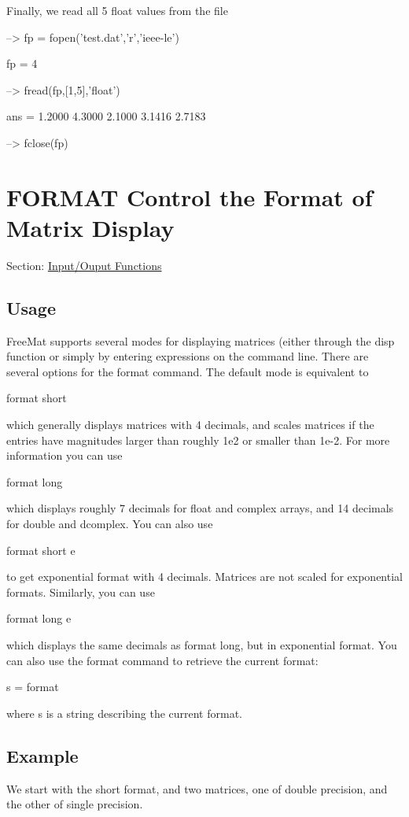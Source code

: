 Finally, we read all 5 {\ttfamily float} values from the file


\begin{DoxyVerbInclude}
--> fp = fopen('test.dat','r','ieee-le')

fp = 
 4 

--> fread(fp,[1,5],'float')

ans = 
    1.2000    4.3000    2.1000    3.1416    2.7183 

--> fclose(fp)
\end{DoxyVerbInclude}
 \hypertarget{io_format}{}\section{F\-O\-R\-M\-A\-T Control the Format of Matrix Display}\label{io_format}
Section\-: \hyperlink{sec_io}{Input/\-Ouput Functions} \hypertarget{vtkwidgets_vtkxyplotwidget_Usage}{}\subsection{Usage}\label{vtkwidgets_vtkxyplotwidget_Usage}
Free\-Mat supports several modes for displaying matrices (either through the {\ttfamily disp} function or simply by entering expressions on the command line. There are several options for the format command. The default mode is equivalent to \begin{DoxyVerb}   format short
\end{DoxyVerb}
 which generally displays matrices with 4 decimals, and scales matrices if the entries have magnitudes larger than roughly {\ttfamily 1e2} or smaller than {\ttfamily 1e-\/2}. For more information you can use \begin{DoxyVerb}   format long
\end{DoxyVerb}
 which displays roughly 7 decimals for {\ttfamily float} and {\ttfamily complex} arrays, and 14 decimals for {\ttfamily double} and {\ttfamily dcomplex}. You can also use \begin{DoxyVerb}   format short e
\end{DoxyVerb}
 to get exponential format with 4 decimals. Matrices are not scaled for exponential formats. Similarly, you can use \begin{DoxyVerb}   format long e
\end{DoxyVerb}
 which displays the same decimals as {\ttfamily format long}, but in exponential format. You can also use the {\ttfamily format} command to retrieve the current format\-: \begin{DoxyVerb}   s = format
\end{DoxyVerb}
 where {\ttfamily s} is a string describing the current format. \hypertarget{variables_struct_Example}{}\subsection{Example}\label{variables_struct_Example}
We start with the short format, and two matrices, one of double precision, and the other of single precision.


